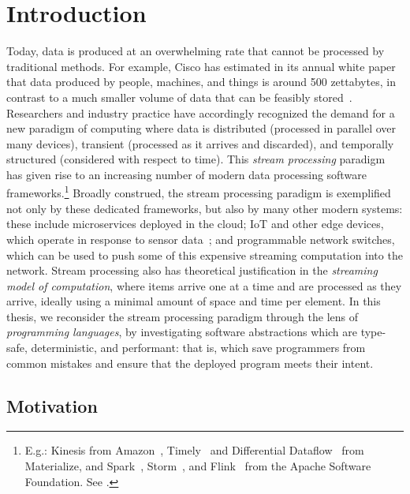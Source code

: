 \chapter{Introduction}
\label{cha:intro}

Today, data is produced at an overwhelming rate
that cannot be processed by traditional methods.
For example, Cisco has estimated in its annual white paper
that data produced by people, machines, and things
is around 500 zettabytes, in contrast to a much smaller volume
of data that can be feasibly stored~\cite{index2018forecast}.
Researchers and industry practice have accordingly recognized the demand
for a new paradigm of computing where data is
distributed (processed in parallel over many devices),
transient (processed as it arrives and discarded),
and temporally structured (considered with respect to time).
This \emph{stream processing} paradigm has given rise to an increasing number
of modern data processing software frameworks.\footnote{
  E.g.: Kinesis from Amazon~\cite{AmazonKinesis}, Timely~\cite{Timely} and Differential Dataflow~\cite{mcsherry2013differential} from Materialize, and Spark~\cite{SparkStreaming}, Storm~\cite{Storm}, and Flink~\cite{Flink} from the Apache Software Foundation.
  See .
}
Broadly construed, the stream processing paradigm is exemplified not only by these dedicated frameworks, but also by many other modern systems: these include microservices deployed in the cloud; IoT and other edge devices, which operate in response
to sensor data~\cite{shi2016edge, ashton2009internet}; and programmable network switches,
which can be used to push some of this expensive streaming computation
into the network.
Stream processing also has theoretical justification in the \emph{streaming model of computation},
where items arrive one at a time and are processed as they arrive, ideally using
a minimal amount of space and time per element.
In this thesis, we reconsider the stream processing paradigm through the lens of \emph{programming languages}, by investigating software abstractions which are type-safe, deterministic, and performant: that is, which save programmers from common mistakes and ensure that the deployed program meets their intent.

\section{Motivation}

